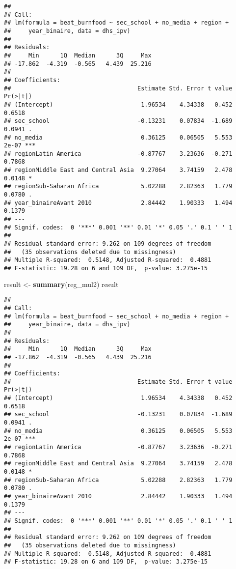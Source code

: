 \documentclass[
]{article}
\newenvironment{Shaded}{\begin{snugshade}}{\end{snugshade}}
\newcommand{\KeywordTok}[1]{\textcolor[rgb]{0.13,0.29,0.53}{\textbf{#1}}}
\newcommand{\NormalTok}[1]{#1}
\newcommand{\StringTok}[1]{\textcolor[rgb]{0.31,0.60,0.02}{#1}}
\begin{document}
\begin{verbatim}
## 
## Call:
## lm(formula = beat_burnfood ~ sec_school + no_media + region + 
##     year_binaire, data = dhs_ipv)
## 
## Residuals:
##     Min      1Q  Median      3Q     Max 
## -17.862  -4.319  -0.565   4.439  25.216 
## 
## Coefficients:
##                                    Estimate Std. Error t value Pr(>|t|)    
## (Intercept)                         1.96534    4.34338   0.452   0.6518    
## sec_school                         -0.13231    0.07834  -1.689   0.0941 .  
## no_media                            0.36125    0.06505   5.553    2e-07 ***
## regionLatin America                -0.87767    3.23636  -0.271   0.7868    
## regionMiddle East and Central Asia  9.27064    3.74159   2.478   0.0148 *  
## regionSub-Saharan Africa            5.02288    2.82363   1.779   0.0780 .  
## year_binaireAvant 2010              2.84442    1.90333   1.494   0.1379    
## ---
## Signif. codes:  0 '***' 0.001 '**' 0.01 '*' 0.05 '.' 0.1 ' ' 1
## 
## Residual standard error: 9.262 on 109 degrees of freedom
##   (35 observations deleted due to missingness)
## Multiple R-squared:  0.5148, Adjusted R-squared:  0.4881 
## F-statistic: 19.28 on 6 and 109 DF,  p-value: 3.275e-15
\end{verbatim}

\begin{Shaded}
\begin{Highlighting}[]
\NormalTok{result <-}\StringTok{ }\KeywordTok{summary}\NormalTok{(reg_mul2)}
\NormalTok{result}
\end{Highlighting}
\end{Shaded}

\begin{verbatim}
## 
## Call:
## lm(formula = beat_burnfood ~ sec_school + no_media + region + 
##     year_binaire, data = dhs_ipv)
## 
## Residuals:
##     Min      1Q  Median      3Q     Max 
## -17.862  -4.319  -0.565   4.439  25.216 
## 
## Coefficients:
##                                    Estimate Std. Error t value Pr(>|t|)    
## (Intercept)                         1.96534    4.34338   0.452   0.6518    
## sec_school                         -0.13231    0.07834  -1.689   0.0941 .  
## no_media                            0.36125    0.06505   5.553    2e-07 ***
## regionLatin America                -0.87767    3.23636  -0.271   0.7868    
## regionMiddle East and Central Asia  9.27064    3.74159   2.478   0.0148 *  
## regionSub-Saharan Africa            5.02288    2.82363   1.779   0.0780 .  
## year_binaireAvant 2010              2.84442    1.90333   1.494   0.1379    
## ---
## Signif. codes:  0 '***' 0.001 '**' 0.01 '*' 0.05 '.' 0.1 ' ' 1
## 
## Residual standard error: 9.262 on 109 degrees of freedom
##   (35 observations deleted due to missingness)
## Multiple R-squared:  0.5148, Adjusted R-squared:  0.4881 
## F-statistic: 19.28 on 6 and 109 DF,  p-value: 3.275e-15
\end{verbatim}
\end{document}
